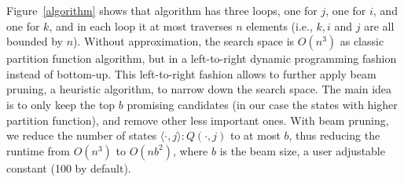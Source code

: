 Figure~\ref{algorithm} shows that \linearpartition algorithm has three loops, 
one for $j$, one for $i$, and one for $k$,
and in each loop it at most traverses $n$ elements (i.e., $k,i$ and $j$ are all bounded by $n$).
Without approximation, the search space is $O(n^3)$ as classic partition function algorithm,
but in a left-to-right dynamic programming fashion instead of bottom-up.
This left-to-right fashion allows to further apply beam pruning,
a heuristic algorithm,
to narrow down the search space.
The main idea is to only keep the top $b$ promising candidates 
(in our case the states %
with higher partition function), %
and remove other less important ones.
With beam pruning, 
we reduce the number of states $\langle \cdot, j \rangle:Q(\cdot,j)$ to at most $b$,
thus reducing the runtime from $O(n^3)$ to $O(nb^2)$, 
where $b$ is the beam size, 
a user adjustable constant
(100 by default).








